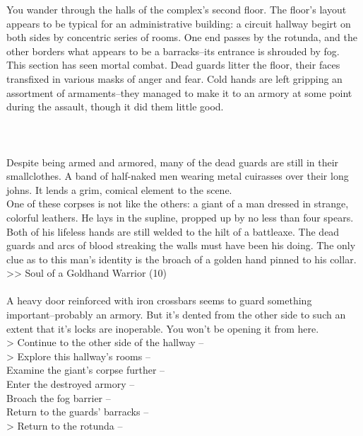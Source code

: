 You wander through the halls of the complex’s second floor. The floor's layout appears to be typical for an administrative building: a circuit hallway begirt on both sides by concentric series of rooms. One end passes by the rotunda, and the other borders what appears to be a barracks--its entrance is shrouded by fog.\\

This section has seen mortal combat. Dead guards litter the floor, their faces transfixed in various masks of anger and fear. Cold hands are left gripping an assortment of armaments--they managed to make it to an armory at some point during the assault, though it did them little good.\\
\\
\\
\\

Despite being armed and armored, many of the dead guards are still in their smallclothes. A band of half-naked men wearing metal cuirasses over their long johns. It lends a grim, comical element to the scene.\\

One of these corpses is not like the others: a giant of a man dressed in strange, colorful leathers. He lays in the supline, propped up by no less than four spears. Both of his lifeless hands are still welded to the hilt of a battleaxe. The dead guards and arcs of blood streaking the walls must have been his doing. The only clue as to this man's identity is the broach of a golden hand pinned to his collar.\\
>> Soul of a Goldhand Warrior (10)\\
\\

A heavy door reinforced with iron crossbars seems to guard something important--probably an armory. But it's dented from the other side to such an extent that it's locks are inoperable. You won't be opening it from here.\\

> Continue to the other side of the hallway -- \\
> Explore this hallway's rooms -- \\
 Examine the giant's corpse further -- \\
 Enter the destroyed armory -- \\
 Broach the fog barrier -- \\
 Return to the guards' barracks -- \\
> Return to the rotunda -- 